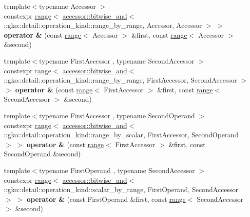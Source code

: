 \begin{DoxyCompactItemize}
\item 
\mbox{\label{namespacegko_abae02a983895d3fc06e9d19c440200a5}} 
{\footnotesize template$<$typename Accessor $>$ }\\constexpr \hyperlink{classgko_1_1range}{range}$<$ \hyperlink{structgko_1_1accessor_1_1bitwise__and}{accessor\+::bitwise\+\_\+and}$<$ \+::gko\+::detail\+::operation\+\_\+kind\+::range\+\_\+by\+\_\+range, Accessor, Accessor $>$ $>$ {\bfseries operator \&} (const \hyperlink{classgko_1_1range}{range}$<$ Accessor $>$ \&first, const \hyperlink{classgko_1_1range}{range}$<$ Accessor $>$ \&second)
\item 
\mbox{\label{namespacegko_af48bc7970fe040fbb3f59bffa7f38b6a}} 
{\footnotesize template$<$typename First\+Accessor , typename Second\+Accessor $>$ }\\constexpr \hyperlink{classgko_1_1range}{range}$<$ \hyperlink{structgko_1_1accessor_1_1bitwise__and}{accessor\+::bitwise\+\_\+and}$<$ \+::gko\+::detail\+::operation\+\_\+kind\+::range\+\_\+by\+\_\+range, First\+Accessor, Second\+Accessor $>$ $>$ {\bfseries operator \&} (const \hyperlink{classgko_1_1range}{range}$<$ First\+Accessor $>$ \&first, const \hyperlink{classgko_1_1range}{range}$<$ Second\+Accessor $>$ \&second)
\item 
\mbox{\label{namespacegko_a80be284fcb9f67ece7e63fd6f030b6b4}} 
{\footnotesize template$<$typename First\+Accessor , typename Second\+Operand $>$ }\\constexpr \hyperlink{classgko_1_1range}{range}$<$ \hyperlink{structgko_1_1accessor_1_1bitwise__and}{accessor\+::bitwise\+\_\+and}$<$ \+::gko\+::detail\+::operation\+\_\+kind\+::range\+\_\+by\+\_\+scalar, First\+Accessor, Second\+Operand $>$ $>$ {\bfseries operator \&} (const \hyperlink{classgko_1_1range}{range}$<$ First\+Accessor $>$ \&first, const Second\+Operand \&second)
\item 
\mbox{\label{namespacegko_af137259d04ea41e3c6701633acab501c}} 
{\footnotesize template$<$typename First\+Operand , typename Second\+Accessor $>$ }\\constexpr \hyperlink{classgko_1_1range}{range}$<$ \hyperlink{structgko_1_1accessor_1_1bitwise__and}{accessor\+::bitwise\+\_\+and}$<$ \+::gko\+::detail\+::operation\+\_\+kind\+::scalar\+\_\+by\+\_\+range, First\+Operand, Second\+Accessor $>$ $>$ {\bfseries operator \&} (const First\+Operand \&first, const \hyperlink{classgko_1_1range}{range}$<$ Second\+Accessor $>$ \&second)

\end{DoxyCompactItemize}

